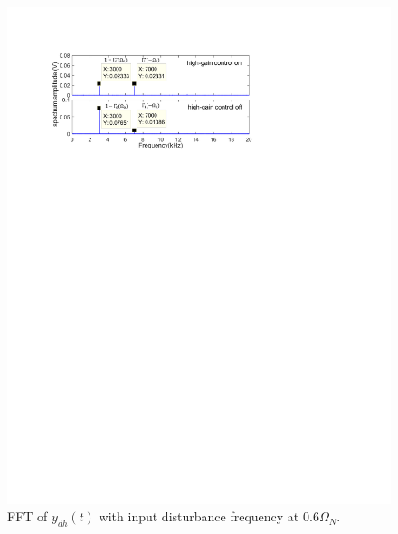 \documentclass [11pt, proquest] {uwthesis}[2020/02/24]
\begin{document}
\begin{figure}[!ht]
\begin{centering}
\includegraphics[width=12cm]{Spectral-analysis/FIG4.pdf}
\par\end{centering}
\caption{\label{fig:FFT-(sampling-time-2}FFT of $y_{dh}(t)$
with input disturbance frequency at $0.6\Omega_{N}$.}
\end{figure}
\end{document}
